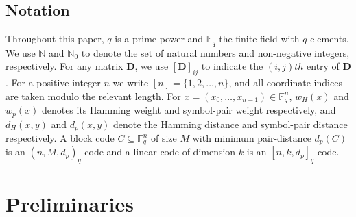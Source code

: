 \documentclass[11pt,draftclsnofoot,journal,onecolumn]{IEEEtran}
\begin{document}
 \subsection{Notation}
    Throughout this paper, $q$ is a prime power and $\mathbb{F}_q$ the finite field with $q$ elements. We use $\mathbb{N}$ and $\mathbb{N}_0$ to denote the set of natural numbers and non-negative integers, respectively. For any matrix $\boldsymbol{D}$, we use $[\boldsymbol{D}]_{ij}$ to indicate the $(i,j)th$ entry of $\boldsymbol{D}$. For a positive integer $n$ we write $[n]=\{1,2,\dots,n\}$, and all coordinate indices are taken modulo the relevant length. For $x=(x_0,\dots,x_{n-1})\in\mathbb{F}_q^{n}$, $w_H(x)$ and $w_p(x)$ denotes its Hamming weight and symbol-pair weight respectively, and $d_H(x,y)$ and $d_p(x,y)$ denote the Hamming distance and symbol-pair distance respectively. A block code $C\subseteq\mathbb{F}_q^{n}$ of size $M$ with minimum pair-distance $d_p(C)$ is an $(n,M,d_p)_q$ code and a linear code of dimension $k$ is an $[n,k,d_p]_q$ code.
% 
% 
% 
% 

\section{Preliminaries}\label{sec:prelim}
    
\end{document}
